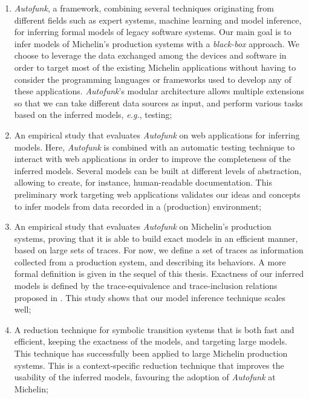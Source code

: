 \begin{enumerate}
    \item \textit{Autofunk}, a framework, combining several
        techniques originating from different fields such as
        expert systems, machine learning and model inference, for
        inferring formal models of legacy software systems. Our
        main goal is to infer models of Michelin's production
        systems with a \emph{black-box} approach. We choose to
        leverage the data exchanged among the devices and
        software in order to target most of the existing Michelin
        applications without having to consider the programming
        languages or frameworks used to develop any of these
        applications. \textit{Autofunk}'s modular architecture
        allows multiple extensions so that we can take different
        data sources as input, and perform various tasks based on
        the inferred models, \emph{e.g.}, testing;

    \item An empirical study that evaluates \textit{Autofunk} on
        web applications for inferring models. Here,
        \textit{Autofunk} is combined with an automatic testing
        technique to interact with web applications in order to
        improve the completeness of the inferred models. Several
        models can be built at different levels of abstraction,
        allowing to create, for instance, human-readable
        documentation. This preliminary work targeting web
        applications validates our ideas and concepts to infer
        models from data recorded in a (production) environment;

    \item An empirical study that evaluates \textit{Autofunk} on
        Michelin's production systems, proving that it is able to
        build exact models in an efficient manner, based on large
        sets of traces. For now, we define a set of traces as
        information collected from a production system, and
        describing its behaviors. A more formal definition is
        given in the sequel of this thesis. Exactness of our
        inferred models is defined by the trace-equivalence and
        trace-inclusion relations proposed in \cite{petrenko06}.
        This study shows that our model inference technique
        scales well;

    \item A reduction technique for symbolic transition systems
        that is both fast and efficient, keeping the exactness of
        the models, and targeting large models. This technique
        has successfully been applied to large Michelin
        production systems. This is a context-specific reduction
        technique that improves the usability of the inferred
        models, favouring the adoption of \emph{Autofunk} at
        Michelin;


\end{enumerate}
